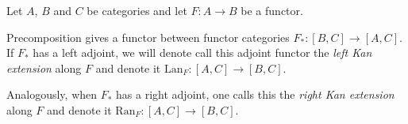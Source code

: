 Let $ A $, $ B $ and $ C $ be categories and let $ F : A \to B $ be a functor.
\begin{definition}
  Precomposition gives a functor between functor categories $ F_* : [B, C] \to [A, C] $. If $ F_* $ has a left adjoint, we will denote call this adjoint functor the \textit{left Kan extension} along $ F $ and denote it $ \mathrm{Lan}_F : [A, C] \to [B, C] $.

  \begin{center}
     \hspace{2cm} 
  \end{center}

  Analogously, when $ F_* $ has a right adjoint, one calls this the \textit{right Kan extension} along $ F $ and denote it $ \mathrm{Ran}_F: [A, C] \to [B, C] $.
\end{definition}

